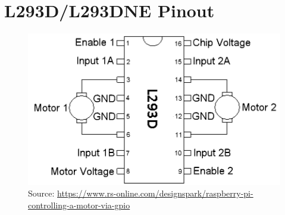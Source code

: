 \section{L293D/L293DNE Pinout}
	\label{sec:pinoutL293}
	\begin{figure}[h]
		\centering
		\includegraphics[width=0.6\linewidth]{McrRaspJam/011_Motors/2_motor/pinout_L293DNE}
		\scriptsize
		\\ Source: \url{https://www.rs-online.com/designspark/raspberry-pi-controlling-a-motor-via-gpio}
		\normalsize
		\label{fig:pinoutL293}
	\end{figure}